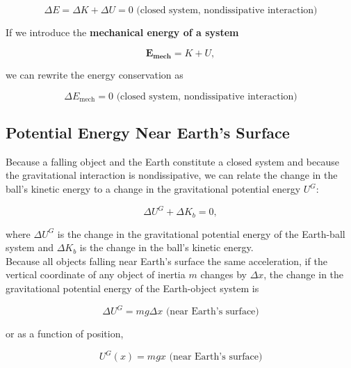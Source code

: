         \[
            \Delta E = \Delta K + \Delta U = 0 \text{ (closed system, nondissipative interaction)}
        \]

        If we introduce the \textbf{mechanical energy of a system}

        \[
            \bm{E_{\text{mech}}} = K + U,
        \]

        we can rewrite the energy conservation as

        \[
            \Delta E_{\text{mech}} = 0 \text{ (closed system, nondissipative interaction)}
        \]



    \subsection{Potential Energy Near Earth's Surface}

        Because a falling object and the Earth constitute a closed system and because the gravitational interaction is nondissipative, we can relate the change in the ball's kinetic energy to a change in the
        gravitational potential energy $U^G$:

        \[
            \Delta U^G + \Delta K_b = 0,
        \]

        where $\Delta U^G$ is the change in the gravitational potential energy of the Earth-ball system and $\Delta K_b$ is the change in the ball's kinetic energy. \\

        Because all objects falling near Earth's surface the same acceleration, if the vertical coordinate of any object of inertia $m$ changes by $\Delta x$, the change in the gravitational potential energy of the
        Earth-object system is

        \[
            \Delta U^G = mg\Delta x \text{ (near Earth's surface)}
        \]

        or as a function of position,

        \[
            U^G (x)  = mgx \text{ (near Earth's surface)}
        \]


